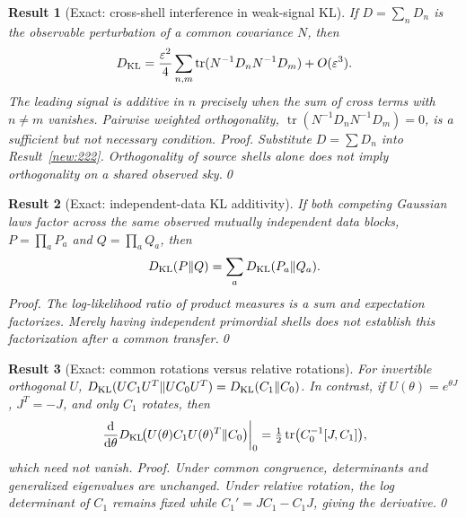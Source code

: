 \documentclass[aps,prd,onecolumn,notitlepage,groupedaddress,11pt]{revtex4-2}
\newtheorem{result}{Result}
\begin{document}
\begin{result}[\textsf{Exact}: cross-shell interference in weak-signal KL]\label{new:226}
If $D=\sum_nD_n$ is the observable perturbation of a common covariance $N$, then
\begin{equation}\label{eq:post226}
D_{\rm KL}=\frac{\varepsilon^2}{4}\sum_{n,m}
\operatorname{tr}(N^{-1}D_nN^{-1}D_m)+O(\varepsilon^3).
\end{equation}
The leading signal is additive in $n$ precisely when the \emph{sum} of cross terms with $n\ne m$ vanishes. Pairwise weighted orthogonality, $\operatorname{tr}(N^{-1}D_nN^{-1}D_m)=0$, is a sufficient but not necessary condition. \textit{Proof.} Substitute $D=\sum D_n$ into Result~\ref{new:222}. Orthogonality of source shells alone does not imply orthogonality on a shared observed sky.\qed
\end{result}

\begin{result}[\textsf{Exact}: independent-data KL additivity]\label{new:227}
If both competing Gaussian laws factor across the \emph{same observed} mutually independent data blocks, $P=\prod_aP_a$ and $Q=\prod_aQ_a$, then
\begin{equation}\label{eq:post227}
D_{\rm KL}(P\Vert Q)=\sum_aD_{\rm KL}(P_a\Vert Q_a).
\end{equation}
\textit{Proof.} The log-likelihood ratio of product measures is a sum and expectation factorizes. Merely having independent primordial shells does not establish this factorization after a common transfer.\qed
\end{result}

\begin{result}[\textsf{Exact}: common rotations versus relative rotations]\label{new:228}
For invertible orthogonal $U$, $D_{\rm KL}(UC_1U^T\Vert UC_0U^T)=D_{\rm KL}(C_1\Vert C_0)$. In contrast, if $U(\theta)=e^{\theta J}$, $J^T=-J$, and only $C_1$ rotates, then
\begin{equation}\label{eq:post228}
\left.\frac{\mathrm d}{\mathrm d\theta}
D_{\rm KL}\!\bigl(U(\theta)C_1U(\theta)^T\Vert C_0\bigr)
\right|_{0}=\tfrac12\operatorname{tr}\bigl(C_0^{-1}[J,C_1]\bigr),
\end{equation}
which need not vanish. \textit{Proof.} Under common congruence, determinants and generalized eigenvalues are unchanged. Under relative rotation, the log determinant of $C_1$ remains fixed while $C_1'=JC_1-C_1J$, giving the derivative.\qed
\end{result}
\end{document}

